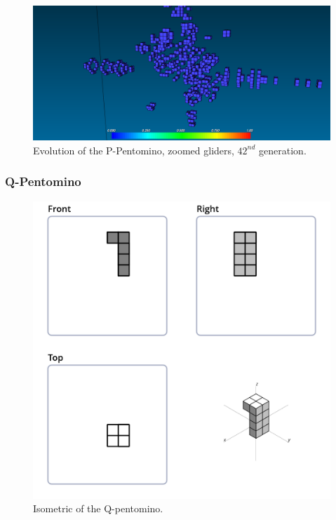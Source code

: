 \begin{figure}[H]
	\centering
	\includegraphics[scale=0.3]{pentominoes_ss/p_42_gliders.png}
	\caption{Evolution of the P-Pentomino, zoomed gliders, $42^{nd}$ generation.}
  \label{fig:ss-pent:p-42-glider}
\end{figure}


\subsubsection{Q-Pentomino}
\label{sec:q-pentomino}

\begin{figure}[H]
	\centering
	\includegraphics[scale=0.3]{iso_diagrams/q.png}
	\caption{Isometric of the Q-pentomino.}
	\label{fig:iso-pent-q}
\end{figure}

